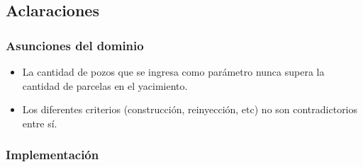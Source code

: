 \subsection{Aclaraciones}

\subsubsection{Asunciones del dominio}
\begin{itemize}
\item La cantidad de pozos que se ingresa como parámetro nunca supera la cantidad de parcelas en el yacimiento.
\item Los diferentes criterios (construcción, reinyección, etc) no son contradictorios entre sí.

\end{itemize}



\subsubsection{Implementación}

